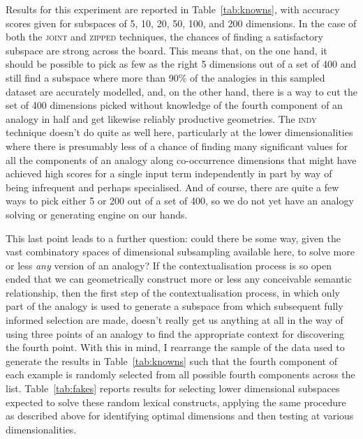 Results for this experiment are reported in Table~\ref{tab:knowns}, with accuracy scores given for subspaces of 5, 10, 20, 50, 100, and 200 dimensions.  In the case of both the \textsc{joint} and \textsc{zipped} techniques, the chances of finding a satisfactory subspace are strong across the board.  This means that, on the one hand, it should be possible to pick as few as the right 5 dimensions out of a set of 400 and still find a subspace where more than 90\% of the analogies in this sampled dataset are accurately modelled, and, on the other hand, there is a way to cut the set of 400 dimensions picked without knowledge of the fourth component of an analogy in half and get likewise reliably productive geometries.  The \textsc{indy} technique doesn't do quite as well here, particularly at the lower dimensionalities where there is presumably less of a chance of finding many significant values for all the components of an analogy along co-occurrence dimensions that might have achieved high scores for a single input term independently in part by way of being infrequent and perhaps specialised.  And of course, there are quite a few ways to pick either 5 or 200 out of a set of 400, so we do not yet have an analogy solving or generating engine on our hands.

This last point leads to a further question: could there be some way, given the vast combinatory spaces of dimensional subsampling available here, to solve more or less \emph{any} version of an analogy?  If the contextualisation process is so open ended that we can geometrically construct more or less any conceivable semantic relationship, then the first step of the contextualisation process, in which only part of the analogy is used to generate a subspace from which subsequent fully informed selection are made, doesn't really get us anything at all in the way of using three points of an analogy to find the appropriate context for discovering the fourth point.  With this in mind, I rearrange the sample of the data used to generate the results in Table~\ref{tab:knowns} such that the fourth component of each example is randomly selected from all possible fourth components across the list.  Table~\ref{tab:fakes} reports results for selecting lower dimensional subspaces expected to solve these random lexical constructs, applying the same procedure as described above for identifying optimal dimensions and then testing at various dimensionalities.

